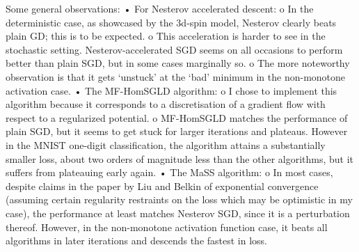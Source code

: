 \documentclass{article}
\begin{document}
Some general observations: 
•	For Nesterov accelerated descent:
o	In the deterministic case, as showcased by the 3d-spin model, Nesterov clearly beats plain GD;  this is to be expected.
o	This acceleration is harder to see in the stochastic setting. Nesterov-accelerated SGD seems on all occasions to perform better than plain SGD, but in some cases marginally so.
o	The more noteworthy observation is that it gets ‘unstuck’ at the ‘bad’ minimum in the non-monotone activation case.
•	The MF-HomSGLD algorithm:
o	I chose to implement this algorithm because it corresponds to a discretisation of a gradient flow with respect to a regularized potential.
o	MF-HomSGLD matches the performance of plain SGD, but it seems to get stuck for larger iterations and plateaus. However in the MNIST one-digit classification, the algorithm attains a substantially smaller loss, about two orders of magnitude less than the other algorithms, but it suffers from plateauing early again.
•	The MaSS algorithm: 
o	In most cases, despite claims in the paper by Liu and Belkin of exponential convergence (assuming certain regularity restraints on the loss which may be optimistic in my case), the performance at least matches Nesterov SGD, since it is a perturbation thereof. However, in the non-monotone activation function case, it beats all algorithms in later iterations and descends the fastest in loss.

\newpage


\end{document}
